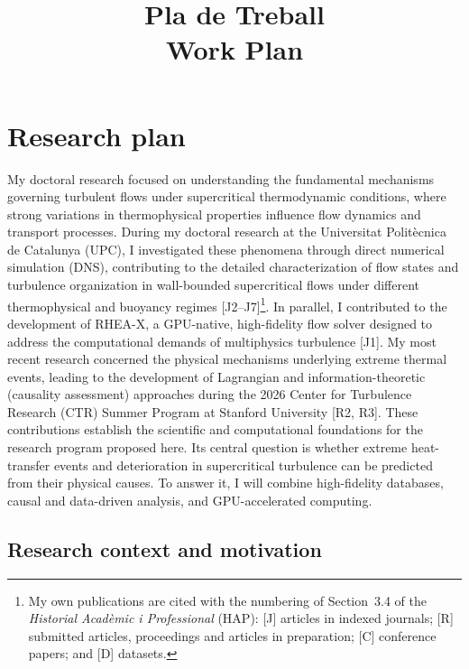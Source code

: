 \documentclass[11pt]{article}
\title{\textbf{Pla de Treball}\\[2pt]\large Work Plan}
\author{\Large \CandName}
\date{}
\begin{document}
\maketitle
\thispagestyle{plain}
\vspace{0.5cm}
\begin{center}\postdata\end{center}

\newpage
\tableofcontents

\section{Research plan}\label{sec:research}

My doctoral research focused on understanding the fundamental mechanisms governing turbulent flows under supercritical thermodynamic conditions, where strong variations in thermophysical properties influence flow dynamics and transport processes.
During my doctoral research at the Universitat Politècnica de Catalunya (UPC), I investigated these phenomena through direct numerical simulation (DNS), contributing to the detailed characterization of flow states and turbulence organization in wall-bounded supercritical flows under different thermophysical and buoyancy regimes [J2--J7]\footnote{My own publications are cited with the numbering of Section~3.4 of the \textit{Historial Acadèmic i Professional} (HAP): [J] articles in indexed journals; [R] submitted articles, proceedings and articles in preparation; [C] conference papers; and [D] datasets.}.
In parallel, I contributed to the development of RHEA-X, a GPU-native, high-fidelity flow solver designed to address the computational demands of multiphysics turbulence [J1].
My most recent research concerned the physical mechanisms underlying extreme thermal events, leading to the development of Lagrangian and information-theoretic (causality assessment) approaches during the 2026 Center for Turbulence Research (CTR) Summer Program at Stanford University [R2, R3].
These contributions establish the scientific and computational foundations for the research program proposed here.
Its central question is whether extreme heat-transfer events and deterioration in supercritical turbulence can be predicted from their physical causes. To answer it, I will combine high-fidelity databases, causal and data-driven analysis, and GPU-accelerated computing.

\subsection{Research context and motivation}\label{sec:background}
\end{document}
